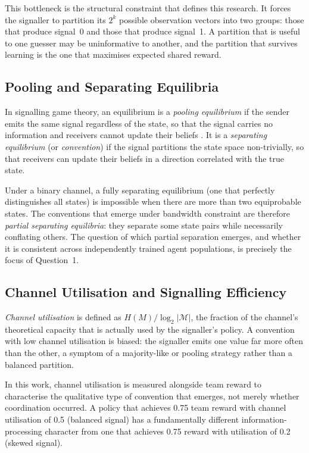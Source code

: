 \documentclass[a4paper,twoside,12pt]{report}
\begin{document}
    This bottleneck is the structural constraint that defines this research.
    It forces the signaller to partition its $2^k$ possible observation
    vectors into two groups: those that produce signal~0 and those that
    produce signal~1. A partition that is useful to one guesser may be
    uninformative to another, and the partition that survives learning is the
    one that maximises expected shared reward.
    
    \subsection*{Pooling and Separating Equilibria}
    
    In signalling game theory, an equilibrium is a \emph{pooling equilibrium}
    if the sender emits the same signal regardless of the state, so that the
    signal carries no information and receivers cannot update their beliefs
    \citep{skyrms2010}. It is a \emph{separating equilibrium} (or
    \emph{convention}) if the signal partitions the state space non-trivially,
    so that receivers can update their beliefs in a direction correlated with
    the true state.
    
    Under a binary channel, a fully separating equilibrium (one that
    perfectly distinguishes all states) is impossible when there are more
    than two equiprobable states. The conventions that emerge under bandwidth
    constraint are therefore \emph{partial separating equilibria}: they
    separate some state pairs while necessarily conflating others. The
    question of which partial separation emerges, and whether it is
    consistent across independently trained agent populations, is precisely
    the focus of Question~1.
    
    \subsection*{Channel Utilisation and Signalling Efficiency}
    
    \emph{Channel utilisation}
    is defined as $H(M) / \log_2 |\mathcal{M}|$, the fraction of the
    channel's theoretical capacity that is actually used by the signaller's
    policy. A convention with low channel utilisation is biased: the signaller
    emits one value far more often than the other, a symptom of a
    majority-like or pooling strategy rather than a balanced partition.
    
    In this work, channel utilisation is measured alongside team reward to
    characterise the qualitative type of convention that emerges, not merely
    whether coordination occurred. A policy that achieves 0.75 team reward
    with channel utilisation of 0.5 (balanced signal) has a fundamentally
    different information-processing character from one that achieves 0.75
    reward with utilisation of 0.2 (skewed signal).
    
\end{document}
